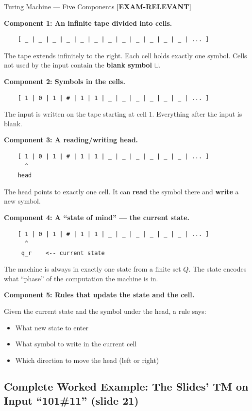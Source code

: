 \documentclass[11pt,a4paper]{article}
\newcommand{\kemark}{\textcolor{red!70!black}{\textbf{[EXAM-RELEVANT]}}}
\begin{document}
\begin{definitionbox}{Turing Machine --- Five Components \kemark}

\textbf{Component 1: An infinite tape divided into cells.}
\begin{lstlisting}
    [ _ | _ | _ | _ | _ | _ | _ | _ | _ | _ | _ | _ | ... ]
\end{lstlisting}
The tape extends infinitely to the right. Each cell holds exactly one symbol. Cells not used by the input contain the \textbf{blank symbol} $\sqcup$.

\textbf{Component 2: Symbols in the cells.}
\begin{lstlisting}
    [ 1 | 0 | 1 | # | 1 | 1 | _ | _ | _ | _ | _ | _ | ... ]
\end{lstlisting}
The input is written on the tape starting at cell 1. Everything after the input is blank.

\textbf{Component 3: A reading/writing head.}
\begin{lstlisting}
    [ 1 | 0 | 1 | # | 1 | 1 | _ | _ | _ | _ | _ | _ | ... ]
      ^
    head
\end{lstlisting}
The head points to exactly one cell. It can \textbf{read} the symbol there and \textbf{write} a new symbol.

\textbf{Component 4: A ``state of mind'' --- the current state.}
\begin{lstlisting}
    [ 1 | 0 | 1 | # | 1 | 1 | _ | _ | _ | _ | _ | _ | ... ]
      ^
     q_r    <-- current state
\end{lstlisting}
The machine is always in exactly one state from a finite set $Q$. The state encodes what ``phase'' of the computation the machine is in.

\textbf{Component 5: Rules that update the state and the cell.}

Given the current state and the symbol under the head, a rule says:
\begin{itemize}[nosep]
\item What new state to enter
\item What symbol to write in the current cell
\item Which direction to move the head (left or right)
\end{itemize}
\end{definitionbox}

\subsection{Complete Worked Example: The Slides' TM on Input ``101\#11'' (slide 21)}
\end{document}
